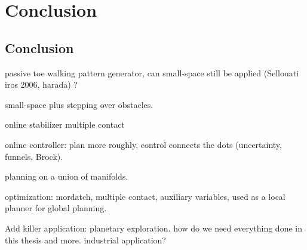 \chapter{Conclusion}
\label{chap:conclusion}

\section{Conclusion}

passive toe walking pattern generator, can small-space still be
applied (Sellouati iros 2006, harada) ?

small-space plus stepping over obstacles.

online stabilizer multiple contact

online controller: plan more roughly, control connects the dots
(uncertainty, funnels, Brock).

planning on a union of manifolds.

optimization: mordatch, multiple contact, auxiliary variables, used as
a local planner for global planning.

Add killer application:
planetary exploration.
how do we need everything done in this thesis and more.
industrial application?

